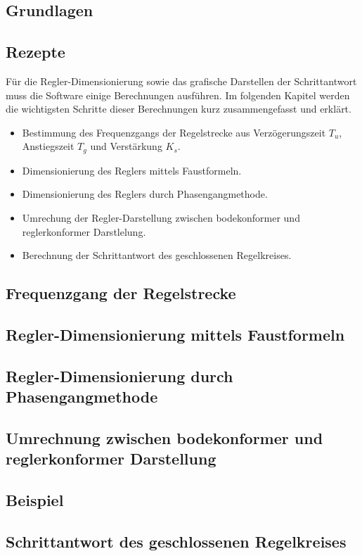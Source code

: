 \subsection{Grundlagen}


\subsection{Rezepte}
F\"ur   die  Regler-Dimensionierung   sowie  das   grafische  Darstellen   der
Schrittantwort  muss   die  Software  einige  Berechnungen   ausf\"uhren.   Im
folgenden  Kapitel werden  die wichtigsten  Schritte dieser  Berechnungen kurz
zusammengefasst und erkl\"art.

\begin{itemize}
    \item
    Bestimmung  des  Frequenzgangs  der  Regelstrecke  aus  Verz\"ogerungszeit
    $T_u$, Anstiegszeit $T_g$ und Verst\"arkung $K_s$.
    \item
    Dimensionierung des Reglers mittels Faustformeln.
    \item
    Dimensionierung des Reglers durch Phasengangmethode.
    \item
    Umrechung der Regler-Darstellung zwischen bodekonformer und reglerkonformer
    Darstlelung. 
    \item
    Berechnung der Schrittantwort des geschlossenen Regelkreises.
\end{itemize}

\subsection{Frequenzgang der Regelstrecke}


\subsection{Regler-Dimensionierung mittels Faustformeln}


\subsection{Regler-Dimensionierung durch Phasengangmethode}


\subsection{Umrechnung zwischen bodekonformer und reglerkonformer Darstellung}


\clearpage
\subsection{Beispiel}


\subsection{Schrittantwort des geschlossenen Regelkreises}


